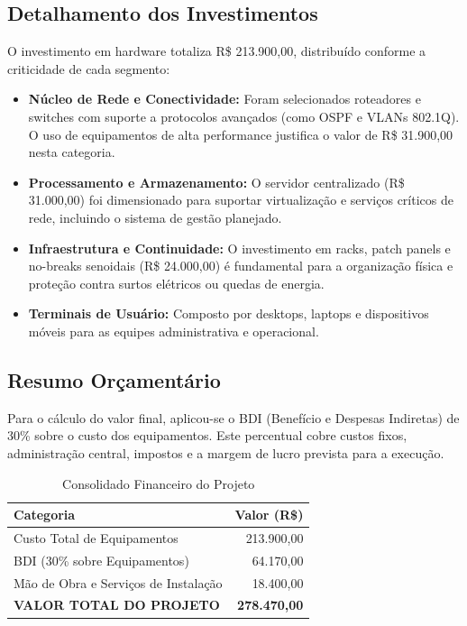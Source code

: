 \documentclass[12pt,a4paper]{article}
\begin{document}
\subsection{Detalhamento dos Investimentos}

O investimento em hardware totaliza R\$ 213.900,00, distribuído conforme a criticidade de cada segmento:

\begin{itemize}
    \item \textbf{Núcleo de Rede e Conectividade:} Foram selecionados roteadores e switches com suporte a protocolos avançados (como OSPF e VLANs 802.1Q). O uso de equipamentos de alta performance justifica o valor de R\$ 31.900,00 nesta categoria.
    \item \textbf{Processamento e Armazenamento:} O servidor centralizado (R\$ 31.000,00) foi dimensionado para suportar virtualização e serviços críticos de rede, incluindo o sistema de gestão planejado.
    \item \textbf{Infraestrutura e Continuidade:} O investimento em racks, patch panels e no-breaks senoidais (R\$ 24.000,00) é fundamental para a organização física e proteção contra surtos elétricos ou quedas de energia.
    \item \textbf{Terminais de Usuário:} Composto por desktops, laptops e dispositivos móveis para as equipes administrativa e operacional.
\end{itemize}

\subsection{Resumo Orçamentário}

Para o cálculo do valor final, aplicou-se o  BDI (Benefício e Despesas Indiretas) de 30\% sobre o custo dos equipamentos. Este percentual cobre custos fixos, administração central, impostos e a margem de lucro prevista para a execução.

\begin{table}[htbp]
\centering
\caption{Consolidado Financeiro do Projeto}
\begin{tabular}{|l|r|}
\hline
\textbf{Categoria} & \textbf{Valor (R\$)} \\ \hline
Custo Total de Equipamentos & 213.900,00 \\ \hline
BDI (30\% sobre Equipamentos) & 64.170,00 \\ \hline
Mão de Obra e Serviços de Instalação & 18.400,00 \\ \hline
\textbf{VALOR TOTAL DO PROJETO} & \textbf{278.470,00} \\ \hline
\end{tabular}
\end{table}
\end{document}
